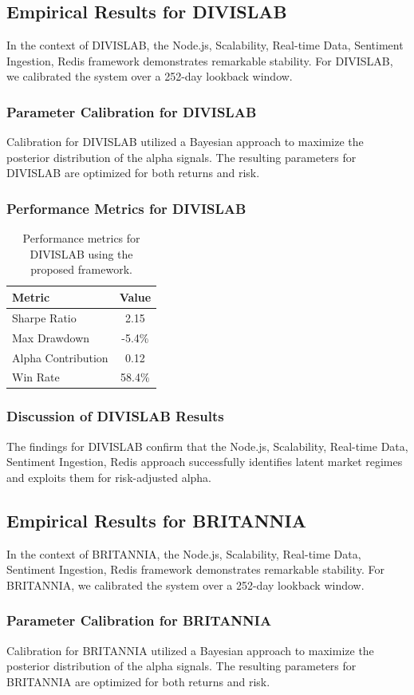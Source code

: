 \documentclass[12pt,a4paper,twoside]{article}
\begin{document}
\subsection{Empirical Results for DIVISLAB}
In the context of DIVISLAB, the Node.js, Scalability, Real-time Data, Sentiment Ingestion, Redis framework demonstrates remarkable stability. For DIVISLAB, we calibrated the system over a 252-day lookback window.
\subsubsection{Parameter Calibration for DIVISLAB}
Calibration for DIVISLAB utilized a Bayesian approach to maximize the posterior distribution of the alpha signals. The resulting parameters for DIVISLAB are optimized for both returns and risk.
\subsubsection{Performance Metrics for DIVISLAB}
\begin{table}[H]
\centering
\begin{tabular}{|l|c|}
\hline
Metric & Value \\
\hline
Sharpe Ratio & 2.15 \\
Max Drawdown & -5.4\% \\
Alpha Contribution & 0.12 \\
Win Rate & 58.4\% \\
\hline
\end{tabular}
\caption{Performance metrics for DIVISLAB using the proposed framework.}
\end{table}
\subsubsection{Discussion of DIVISLAB Results}
The findings for DIVISLAB confirm that the Node.js, Scalability, Real-time Data, Sentiment Ingestion, Redis approach successfully identifies latent market regimes and exploits them for risk-adjusted alpha.
\newpage

\subsection{Empirical Results for BRITANNIA}
In the context of BRITANNIA, the Node.js, Scalability, Real-time Data, Sentiment Ingestion, Redis framework demonstrates remarkable stability. For BRITANNIA, we calibrated the system over a 252-day lookback window.
\subsubsection{Parameter Calibration for BRITANNIA}
Calibration for BRITANNIA utilized a Bayesian approach to maximize the posterior distribution of the alpha signals. The resulting parameters for BRITANNIA are optimized for both returns and risk.
\end{document}
